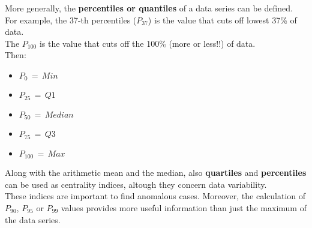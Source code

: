 
\begin{frame}
  \vspace{.15cm}
  More generally, the \textbf{percentiles or quantiles} of a data series can be defined.\\
  \vspace{.25cm}
  For example, the 37-th percentiles ($P_{37}$) is the value that cuts off lowest 37\% of data.\\
  \vspace{.25cm}
  The $P_{100}$ is the value that cuts off the 100\% (more or less!!) of data.\\
  \vspace{.25cm}
  Then:\\
  \vspace{.15cm}
  \begin{itemize}
  \item  {\boldmath $P_0\,=\,Min$}
  \item  {\boldmath $P_{25}\,=\,Q1$}
  \item  {\boldmath $P_{50}\,=\,Median$}
  \item  {\boldmath $P_{75}\,=\,Q3$}
  \item  {\boldmath $P_{100}\,=\,Max$}
  \end{itemize}
\end{frame}

\begin{frame}
  \vspace*{.75cm}
  Along with the arithmetic mean and the median, also \textbf{quartiles} and \textbf{percentiles} can be used as centrality indices, altough they concern data variability.\\
  \vspace*{1.25cm}
  These indices are important to find anomalous cases. Moreover, the calculation of $P_{90}$, $P_{95}$ or $P_{99}$ values provides more useful information than just the maximum of the data series.
\end{frame}


